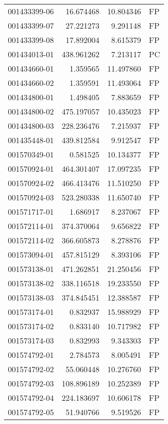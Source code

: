 \begin{tabular}{lrrl}
001433399-06 &   16.674468 &    10.804346 &   FP \\
001433399-07 &   27.221273 &     9.291148 &   FP \\
001433399-08 &   17.892004 &     8.615379 &   FP \\
001434013-01 &  438.961262 &     7.213117 &   PC \\
001434660-01 &    1.359565 &    11.497860 &   FP \\
001434660-02 &    1.359591 &    11.493064 &   FP \\
001434800-01 &    1.498405 &     7.883659 &   FP \\
001434800-02 &  475.197057 &    10.435023 &   FP \\
001434800-03 &  228.236476 &     7.215937 &   FP \\
001435448-01 &  439.812584 &     9.912547 &   FP \\
001570349-01 &    0.581525 &    10.134377 &   FP \\
001570924-01 &  464.301407 &    17.097235 &   FP \\
001570924-02 &  466.413476 &    11.510250 &   FP \\
001570924-03 &  523.280338 &    11.650740 &   FP \\
001571717-01 &    1.686917 &     8.237067 &   FP \\
001572114-01 &  374.370064 &     9.656822 &   FP \\
001572114-02 &  366.605873 &     8.278876 &   FP \\
001573094-01 &  457.815129 &     8.393106 &   FP \\
001573138-01 &  471.262851 &    21.250456 &   FP \\
001573138-02 &  338.116518 &    19.233550 &   FP \\
001573138-03 &  374.845451 &    12.388587 &   FP \\
001573174-01 &    0.832937 &    15.988929 &   FP \\
001573174-02 &    0.833140 &    10.717982 &   FP \\
001573174-03 &    0.832993 &     9.343303 &   FP \\
001574792-01 &    2.784573 &     8.005491 &   FP \\
001574792-02 &   55.060448 &    10.276760 &   FP \\
001574792-03 &  108.896189 &    10.252389 &   FP \\
001574792-04 &  224.183697 &    10.606178 &   FP \\
001574792-05 &   51.940766 &     9.519526 &   FP \\

\end{tabular}
